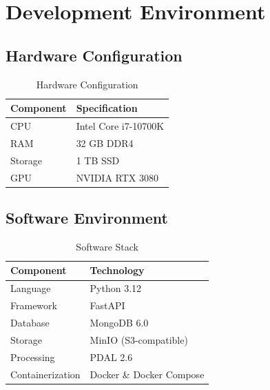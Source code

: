 \documentclass[12pt,a4paper,onecolumn,oneside]{report}
\begin{document}
\section{Development Environment}
\label{sec:impl:environment}

\subsection{Hardware Configuration}
\label{sec:impl:hardware}

\begin{table}[h]
    \centering
    \caption{Hardware Configuration}
    \label{tab:hardware}
    \begin{tabular}{|l|l|}
        \hline
        \textbf{Component} & \textbf{Specification} \\
        \hline
        CPU & Intel Core i7-10700K \\
        \hline
        RAM & 32 GB DDR4 \\
        \hline
        Storage & 1 TB SSD \\
        \hline
        GPU & NVIDIA RTX 3080 \\
        \hline
    \end{tabular}
\end{table}

\subsection{Software Environment}
\label{sec:impl:software}

\begin{table}[h]
    \centering
    \caption{Software Stack}
    \label{tab:software}
    \begin{tabular}{|l|l|}
        \hline
        \textbf{Component} & \textbf{Technology} \\
        \hline
        Language & Python 3.12 \\
        \hline
        Framework & FastAPI \\
        \hline
        Database & MongoDB 6.0 \\
        \hline
        Storage & MinIO (S3-compatible) \\
        \hline
        Processing & PDAL 2.6 \\
        \hline
        Containerization & Docker \& Docker Compose \\
        \hline
    \end{tabular}
\end{table}
\end{document}
